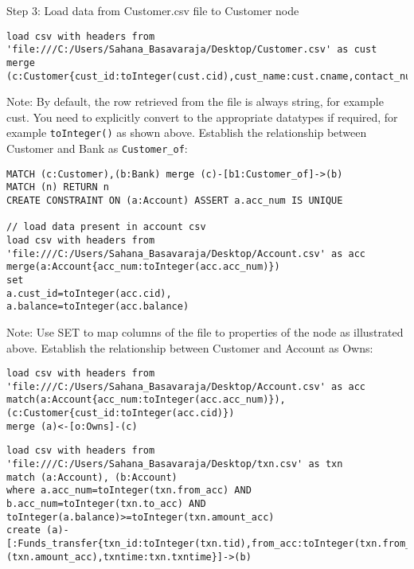 \documentclass[../main.tex]{subfiles}
\begin{document}
Step 3:
Load data from Customer.csv file to Customer node
\begin{lstlisting}[language=cypher]
load csv with headers from 'file:///C:/Users/Sahana_Basavaraja/Desktop/Customer.csv' as cust
merge (c:Customer{cust_id:toInteger(cust.cid),cust_name:cust.cname,contact_num:toInteger(cust.phnum)})
\end{lstlisting}
Note: By default, the row retrieved from the file is always string, for example cust. You need to explicitly convert to the appropriate datatypes if required, for example \lstinline{toInteger()} as shown above.
Establish the relationship between Customer and Bank as \lstinline{Customer_of}:
\begin{lstlisting}[language=cypher]
MATCH (c:Customer),(b:Bank) merge (c)-[b1:Customer_of]->(b)
MATCH (n) RETURN n
CREATE CONSTRAINT ON (a:Account) ASSERT a.acc_num IS UNIQUE

// load data present in account csv
load csv with headers from 'file:///C:/Users/Sahana_Basavaraja/Desktop/Account.csv' as acc
merge(a:Account{acc_num:toInteger(acc.acc_num)})
set 
a.cust_id=toInteger(acc.cid),
a.balance=toInteger(acc.balance)

\end{lstlisting}
Note: Use SET to map columns of the file to properties of the node as illustrated above.
Establish the relationship between Customer and Account as Owns:

\begin{lstlisting}[language=cypher]
load csv with headers from 'file:///C:/Users/Sahana_Basavaraja/Desktop/Account.csv' as acc
match(a:Account{acc_num:toInteger(acc.acc_num)}),(c:Customer{cust_id:toInteger(acc.cid)})
merge (a)<-[o:Owns]-(c)

\end{lstlisting}

\begin{lstlisting}[language=cypher]
load csv with headers from 'file:///C:/Users/Sahana_Basavaraja/Desktop/txn.csv' as txn
match (a:Account), (b:Account)
where a.acc_num=toInteger(txn.from_acc) AND b.acc_num=toInteger(txn.to_acc) AND toInteger(a.balance)>=toInteger(txn.amount_acc)
create (a)-[:Funds_transfer{txn_id:toInteger(txn.tid),from_acc:toInteger(txn.from_acc),to_acc:toInteger(txn.to_acc),amount:toInteger
(txn.amount_acc),txntime:txn.txntime}]->(b)
\end{lstlisting}

\printglossaries
\end{document}
